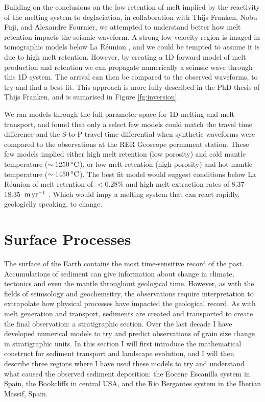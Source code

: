 Building on the conclusions on the low retention of melt implied by the reactivity of the melting system to deglaciation, in collaboration with Thijs Franken, Nobu Fuji, and Alexandre Fournier, we attempted to understand better how melt retention impacts the seismic waveform. A strong low velocity region is imaged in tomographic models below La Réunion \citep{mazzulo-etal-2018}, and we could be tempted to assume it is due to high melt retention. However, by creating a 1D forward model of melt production and retention we can propagate numerically a seimsic wave through this 1D system. The arrival can then be compared to the observed waveforms, to try and find a best fit. This approach is more fully described in the PhD thesis of Thijs Franken, and is sumarised in Figure \ref{fg:inversion}.

We ran models through the full parameter space for 1D melting and melt transport, and found that only a select few models could match the travel time difference and the S-to-P travel time differential when synthetic waveforms were compared to the observations at the RER Geoscope permanent station. These few models implied either high melt retention (low porosity) and cold mantle temperature ($\sim 1250\rm\,^{\circ}C$), or low melt retention (high porosity) and hot mantle temperature ($\sim 1450\rm\,^{\circ}C$). The best fit model would suggest conditions below La Réunion of melt retention of $<$0.28\% and high melt extraction rates of 8.37-18.35 $\rm\,m\,yr^{-1}$ \citep{franken-etal-2020}. Which would impy a melting system that can react rapidly, geologiclly speaking, to change.

\section{Surface Processes}

The surface of the Earth contains the most time-sensitive record of the past. Accumulations of sediment can give information about change in climate, tectonics and even the mantle throughout geological time. However, as with the fields of seimsology and geochemsitry, the observations require interpretation to extrapolate how physical processes have impacted the geological record. As with melt generation and transport, sediments are created and transported to create the final observation: a stratigraphic section. Over the last decade I have developed numerical models to try and predict observations of grain size change in stratigraphic units. In this section I will first introduce the mathematical construct for sediment transport and landscape evolution, and I will then describe three regions where I have used these models to try and understand what caused the observed sediment deposition: the Eocene Escanilla system in Spain, the Bookcliffs in central USA, and the Rio Bergantes system in the Iberian Massif, Spain.

